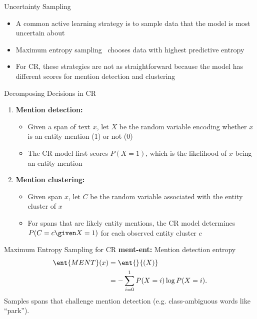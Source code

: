 \begin{frame}{Uncertainty Sampling}
\begin{itemize}
 \item A common active learning strategy is to sample data that the model is most
uncertain about
 \item Maximum entropy sampling~\citep{lewis-1994} chooses data with
highest predictive entropy
 \item For CR, these strategies are not as straightforward because
the model has different scores for mention detection and clustering
\end{itemize}
\end{frame}


\begin{frame}{Decomposing Decisions in CR}

\begin{enumerate}
 \item \textbf{Mention detection:}
    \begin{itemize}
        \item Given a span of text $x$, let $X$ be the random variable encoding whether $x$ is an
entity mention (1) or not (0)
        \item The CR model first scores $P(X=1)$, which is the likelihood of $x$
            being an entity mention
    \end{itemize}
 \item \textbf{Mention clustering:}
    \begin{itemize}
        \item Given span $x$, let $C$ be the random variable associated with the entity
cluster of $x$
        \item For spans that are likely entity mentions, the CR
model determines $P(C=c \given X=1)$ for each observed entity cluster $c$
    \end{itemize}
\end{enumerate}
\end{frame}

\begin{frame}{Maximum Entropy Sampling for CR}
\textbf{ment-ent:} Mention detection entropy
\begin{align}
    \ent{MENT}(x)
        &= \ent{}{(X)} \\
        &= - \sum_{i=0}^1 P(X=i) \log P(X=i). \nonumber
\end{align}
Samples spans that challenge mention detection (e.g. class-ambiguous words like
``park'').
\end{frame}

